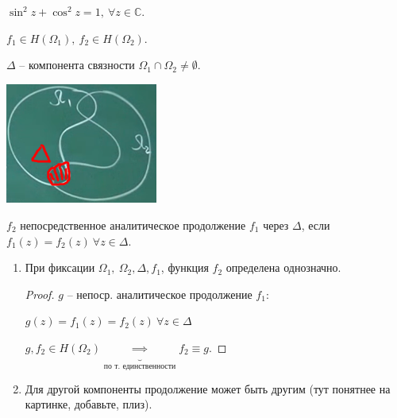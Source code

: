 \begin{consequence}
    $\sin^2{z} + \cos^2{z} = 1, \ \forall z \in \mathbb{C}$.
\end{consequence}




\begin{definition}

    $f_1 \in H(\Omega_1), \ f_2 \in H(\Omega_2)$.

    $\Delta$ -- компонента связности $\Omega_1 \cap \Omega_2 \not = \emptyset$.

    \begin{center}
        \includegraphics[width=5cm]{assets/04-functions-of-complex-variables/analitical-extension-difinition.png}
    \end{center}

    $f_2$ непосредственное аналитическое продолжение $f_1$ через $\Delta$, если $f_1(z) = f_2(z) \ \forall z \in \Delta$.
\end{definition}
\begin{remark}
    \begin{enumerate}
        \item {
            При фиксации $\Omega_1, \ \Omega_2, \Delta, f_1$, функция $f_2$ определена однозначно.

            \begin{proof}
                $g$ -- непоср. аналитическое продолжение $f_1$:

                $g(z) = f_1(z) = f_2(z) \ \forall z \in \Delta$

                $g, f_2 \in H(\Omega_2) \underbrace{\implies}_{\text{по т. единственности}} f_2 \equiv g$.
            \end{proof}
        }
        \item {
            Для другой компоненты продолжение может быть другим (тут понятнее на картинке, добавьте, плиз).
        }
    \end{enumerate}
\end{remark}

